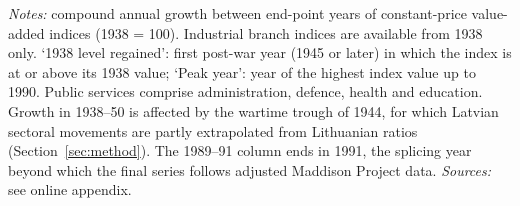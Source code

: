 \begin{table}[htbp]
\begin{threeparttable}
\begin{tablenotes}
\footnotesize
\textit{Notes:} compound annual growth between end-point years of constant-price value-added indices (1938 = 100). Industrial branch indices are available from 1938 only. `1938 level regained': first post-war year (1945 or later) in which the index is at or above its 1938 value; `Peak year': year of the highest index value up to 1990. Public services comprise administration, defence, health and education. Growth in 1938--50 is affected by the wartime trough of 1944, for which Latvian sectoral movements are partly extrapolated from Lithuanian ratios (Section~\ref{sec:method}). The 1989--91 column ends in 1991, the splicing year beyond which the final series follows adjusted Maddison Project data. \textit{Sources:} see online appendix.
\end{tablenotes}
\end{threeparttable}
\end{table}
